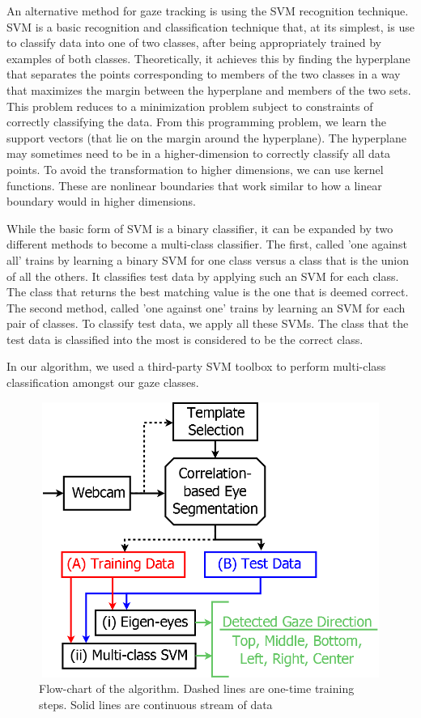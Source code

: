\documentclass[12pt,letterpaper]{article}
\begin{document}
\begin{multicols}{2}
An alternative method for gaze tracking is using the SVM recognition technique. SVM is a basic recognition
and classification technique that, at its simplest, is use to classify data into one of two classes, after
being appropriately trained by examples of both classes. Theoretically, it achieves this by finding the
hyperplane that separates the points corresponding to members of the two classes in a way that maximizes
the margin between the hyperplane and members of the two sets. This problem reduces to a minimization 
problem subject to constraints of correctly classifying the data. From this programming problem, we learn
the support vectors (that lie on the margin around the hyperplane). The hyperplane may sometimes 
need to be in a higher-dimension to correctly classify all data points. To avoid the transformation 
to higher dimensions, we can use kernel functions. These are nonlinear boundaries that work similar to 
how a linear boundary would in higher dimensions.

While the basic form of SVM is a binary classifier, it can be expanded by two different methods to become
a multi-class classifier. The first, called 'one against all' trains by learning a binary SVM for one class
versus a class that is the union of all the others. It classifies test data by applying such an SVM for
each class. The class that returns the best matching value is the one that is deemed correct. The second
method, called 'one against one' trains by learning an SVM for each pair of classes. To classify test
data, we apply all these SVMs. The class that the test data is classified into the most is considered to 
be the correct class.

In our algorithm, we used a third-party SVM toolbox \cite{SVM-KMToolbox} to perform multi-class 
classification amongst our gaze classes. 


\end{multicols}

\begin{figure}[h]
\centering
\includegraphics[width=130mm,height=90mm]{algo.png}
\caption{Flow-chart of the algorithm. Dashed lines are one-time training steps. Solid lines are continuous
stream of data}
\end{figure}
\end{document}
